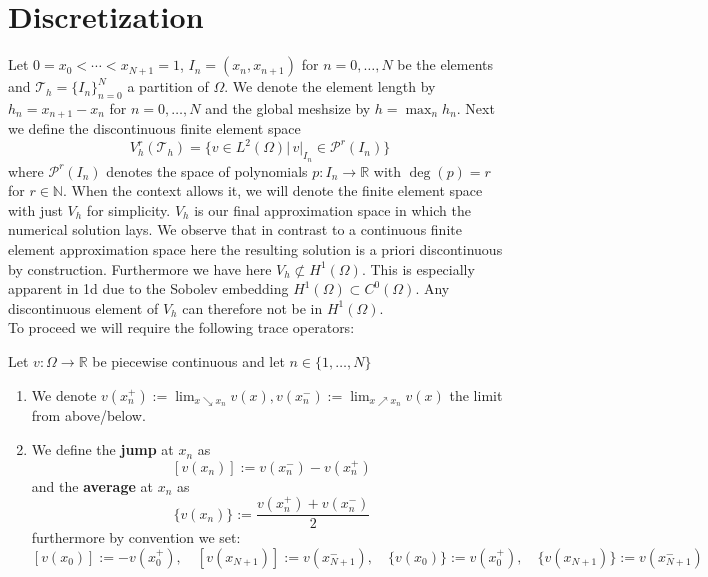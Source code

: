 \section{Discretization}
Let $0=x_0 < \cdots < x_{N+1} = 1$, $I_n = (x_n, x_{n+1})$ for $n = 0,\ldots,N$ be the elements and $\mathcal{T}_h = \{I_n\}_{n=0}^N$ a partition
of $\Omega$.
We denote the element length by $h_n = x_{n+1} - x_{n}$ for $n=0,\ldots,N$ and the global meshsize by
$h = \max_{n} h_n$.
Next we define the discontinuous finite element space
\begin{equation}
    V_h^r(\mathcal{T}_h) = \{v \in L^2(\Omega) |\, v|_{I_n} \in \mathcal{P}^r(I_n) \} 
\end{equation}
where $\mathcal{P}^r(I_n)$ denotes the space of polynomials $p:I_n \to \mathbb{R}$ with $\deg(p) = r$
for $r \in \mathbb{N}$. When the context allows it, we will denote the
finite element space with just $V_h$ for simplicity. 
$V_h$ is our final approximation space in which the numerical solution
lays.
We observe that in contrast to a continuous finite element approximation space 
here the resulting solution is a priori discontinuous by construction. 
Furthermore we have here $V_h \not\subset H^1(\Omega)$. 
This is especially apparent in 1d due to the Sobolev embedding $H^1(\Omega) \subset C^0(\Omega)$.
Any discontinuous element of $V_h$ can therefore not be in $H^1(\Omega)$. \\
To proceed we will require the following trace operators:

\begin{definition} 
    Let $v:\Omega \to \mathbb{R}$ be piecewise continuous and let $n \in
    \{1,\ldots,N\}$
    \begin{enumerate}[label=\textnormal{(\roman*)}]
        \item We denote $v(x_n^+) := \lim_{x \searrow x_n} v(x), v(x_n^-) := \lim_{x \nearrow x_n} v(x)$
        the limit from above/below.
        \item We define the \textbf{jump} at $x_n$ as
        \[
        [v(x_n)]:= v(x_n^-) - v(x_n^+)
        \]
        and the \textbf{average} at $x_n$ as
        \[
            \{v(x_n)\}:= \frac{v(x_n^+) + v(x_n^-)}{2}
        \]
        furthermore by convention we set: 
        \[
            [v(x_0)] := -v(x_0^+),\quad [v(x_{N+1})] := v(x_{N+1}^-),\quad 
            \{v(x_0)\}:=v(x_0^+),\quad \{v(x_{N+1})\}:= v(x_{N+1}^-)
        \]  
    \end{enumerate}
\end{definition}

